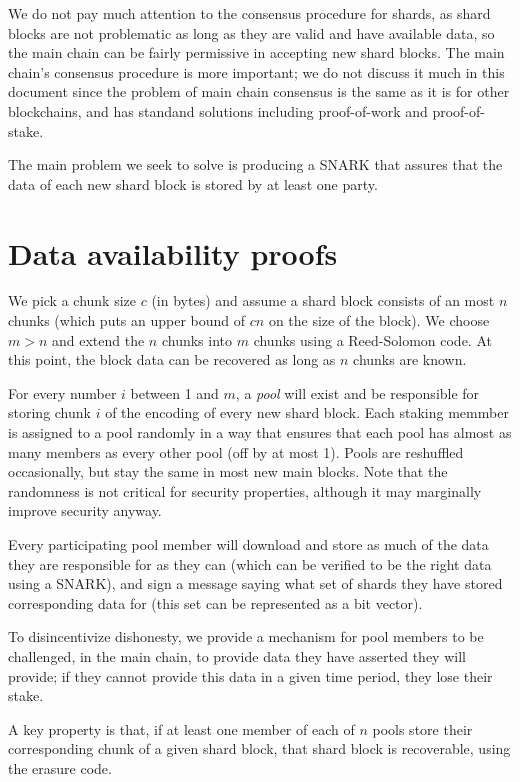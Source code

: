\documentclass{article}
\begin{document}
We do not pay much attention to the consensus procedure for shards, as shard blocks are not problematic as long as they are valid and have available data, so the main chain can be fairly permissive in accepting new shard blocks.  The main chain's consensus procedure is more important; we do not discuss it much in this document since the problem of main chain consensus is the same as it is for other blockchains, and has standand solutions including proof-of-work and proof-of-stake.

The main problem we seek to solve is producing a SNARK that assures that the data of each new shard block is stored by at least one party.

\section{Data availability proofs}

We pick a chunk size $c$ (in bytes) and assume a shard block consists of an most $n$ chunks (which puts an upper bound of $cn$ on the size of the block).  We choose $m > n$ and extend the $n$ chunks into $m$ chunks using a Reed-Solomon code.  At this point, the block data can be recovered as long as $n$ chunks are known.

For every number $i$ between 1 and $m$, a \emph{pool} will exist and be responsible for storing chunk $i$ of the encoding of every new shard block.  Each staking memmber is assigned to a pool randomly in a way that ensures that each pool has almost as many members as every other pool (off by at most 1).  Pools are reshuffled occasionally, but stay the same in most new main blocks.  Note that the randomness is not critical for security properties, although it may marginally improve security anyway.



Every participating pool member will download and store as much of the data they are responsible for as they can (which can be verified to be the right data using a SNARK), and sign a message
saying what set of shards they have stored corresponding data for (this set can be represented as a bit vector).

To disincentivize dishonesty, we provide a mechanism for pool members to be challenged, in the main chain, to provide data they have asserted they will provide; if they cannot provide this data in a given time period, they lose their stake.

A key property is that, if at least one member of each of $n$ pools store their corresponding chunk of a given shard block, that shard block is recoverable, using the erasure code.
\end{document}
